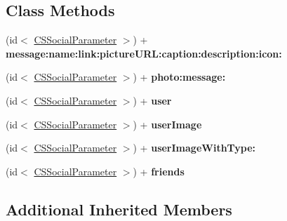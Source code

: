 \subsection*{Class Methods}
\begin{DoxyCompactItemize}
\item 
\hypertarget{interface_c_s_facebook_parameter_abf9e0077e429ca541883b789a3a27f08}{(id$<$ \hyperlink{interface_c_s_social_parameter}{C\-S\-Social\-Parameter} $>$) + {\bfseries message\-:name\-:link\-:picture\-U\-R\-L\-:caption\-:description\-:icon\-:}}\label{interface_c_s_facebook_parameter_abf9e0077e429ca541883b789a3a27f08}

\item 
\hypertarget{interface_c_s_facebook_parameter_a0bff493610c9573c772389fede0cbf4c}{(id$<$ \hyperlink{interface_c_s_social_parameter}{C\-S\-Social\-Parameter} $>$) + {\bfseries photo\-:message\-:}}\label{interface_c_s_facebook_parameter_a0bff493610c9573c772389fede0cbf4c}

\item 
\hypertarget{interface_c_s_facebook_parameter_a1f6b98d756a8267aae6ebd77e842f878}{(id$<$ \hyperlink{interface_c_s_social_parameter}{C\-S\-Social\-Parameter} $>$) + {\bfseries user}}\label{interface_c_s_facebook_parameter_a1f6b98d756a8267aae6ebd77e842f878}

\item 
\hypertarget{interface_c_s_facebook_parameter_a0f22ffa692f95658b1087b55b7ecd2e7}{(id$<$ \hyperlink{interface_c_s_social_parameter}{C\-S\-Social\-Parameter} $>$) + {\bfseries user\-Image}}\label{interface_c_s_facebook_parameter_a0f22ffa692f95658b1087b55b7ecd2e7}

\item 
\hypertarget{interface_c_s_facebook_parameter_aee890338100eb69d2d3fade7f16df546}{(id$<$ \hyperlink{interface_c_s_social_parameter}{C\-S\-Social\-Parameter} $>$) + {\bfseries user\-Image\-With\-Type\-:}}\label{interface_c_s_facebook_parameter_aee890338100eb69d2d3fade7f16df546}

\item 
\hypertarget{interface_c_s_facebook_parameter_a12d17833a134a0a71ce5d795506e01e8}{(id$<$ \hyperlink{interface_c_s_social_parameter}{C\-S\-Social\-Parameter} $>$) + {\bfseries friends}}\label{interface_c_s_facebook_parameter_a12d17833a134a0a71ce5d795506e01e8}

\end{DoxyCompactItemize}
\subsection*{Additional Inherited Members}
